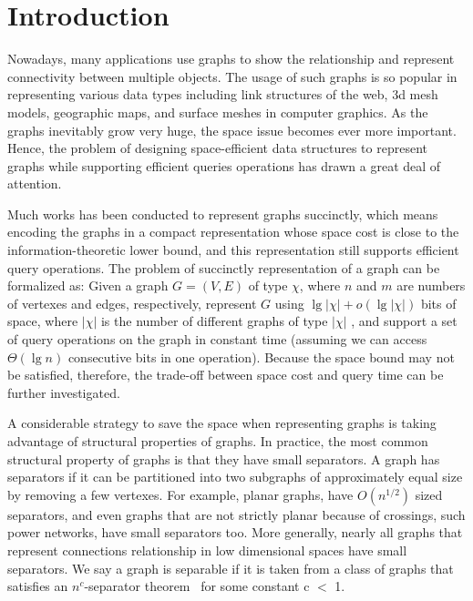 \documentclass[12pt,glossary]{dalthesis}
\begin{document}
\mainmatter

\chapter{Introduction}

Nowadays, many applications use graphs to show the relationship and represent connectivity between multiple objects. The usage of such graphs is so popular in representing various data types including link structures of the web, 3d mesh models, geographic maps, and surface meshes in computer graphics. As the graphs inevitably grow very huge, the space issue becomes ever more important. Hence, the problem of designing space-efficient data structures to represent graphs while supporting efficient queries operations has drawn a great deal of attention. 

\bigskip
Much works has been conducted to represent graphs succinctly, which means encoding the graphs in a compact representation whose space cost is close to the information-theoretic lower bound, and this representation still supports efficient query operations. The problem of succinctly representation of a graph can be formalized as: Given a graph $G = (V, E)$ of type $\chi$, where $n$ and $m$ are numbers of vertexes and edges, respectively, represent $G$ using $\lg | \chi | + o(\lg | \chi | )$ bits of space, where $|\chi|$ is the number of different graphs of type $|\chi|$ , and support a set of query operations on the graph in constant time (assuming we can access $\Theta(\lg n)$ consecutive bits in one operation). Because the space bound may not be satisfied, therefore, the trade-off between space cost and query time can be further investigated.  

\bigskip

A considerable strategy to save the space when representing graphs is taking advantage of structural properties of graphs. In practice, the most common structural property of graphs is that they have small separators. A graph has separators if it can be partitioned into two subgraphs of approximately equal size by removing a few vertexes. For example, planar graphs, have $O(n^{1/2})$ sized separators, and even graphs that are not strictly planar because of crossings, such power networks, have small separators too. More generally, nearly all graphs that represent connections relationship in low dimensional spaces have small separators. We say a graph is separable if it is taken from a class of graphs that satisfies an $n^{c}$-separator theorem~\cite{separator-theorem} for some constant c $<$ 1.
\end{document}

